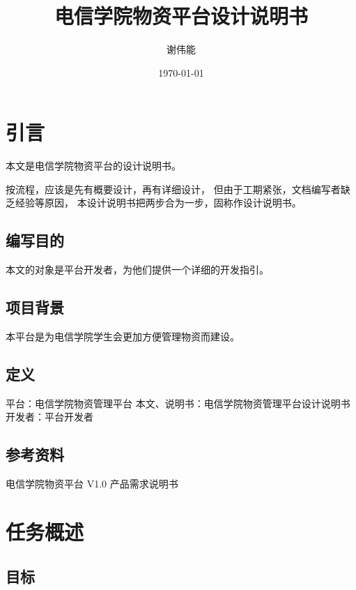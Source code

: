 \documentclass[a4paper,fancyhdr,fntef,hyperref]{ctexart}
\title{电信学院物资平台设计说明书}
\author{谢伟能}
\date{\today}
\begin{document}
\maketitle
\newpage

\section{引言}\label{ux5f15ux8a00}

本文是电信学院物资平台的设计说明书。

按流程，应该是先有概要设计，再有详细设计，
但由于工期紧张，文档编写者缺乏经验等原因，
本设计说明书把两步合为一步，固称作设计说明书。

\subsection{编写目的}\label{ux7f16ux5199ux76eeux7684}

本文的对象是平台开发者，为他们提供一个详细的开发指引。

\subsection{项目背景}\label{ux9879ux76eeux80ccux666f}

本平台是为电信学院学生会更加方便管理物资而建设。

\subsection{定义}\label{ux5b9aux4e49}

平台：电信学院物资管理平台 本文、说明书：电信学院物资管理平台设计说明书
开发者：平台开发者

\subsection{参考资料}\label{ux53c2ux8003ux8d44ux6599}

电信学院物资平台 V1.0 产品需求说明书

\section{任务概述}\label{ux4efbux52a1ux6982ux8ff0}

\subsection{目标}\label{ux76eeux6807}
\end{document}

